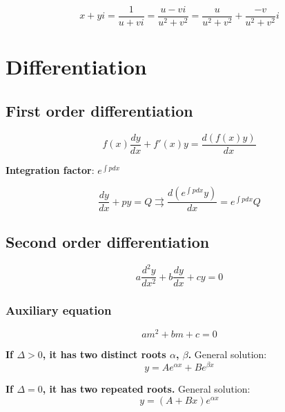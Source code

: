 \documentclass[a4paper,9pt]{scrartcl}
\begin{document}
    \begin{displaymath}
        x + yi = \frac{1}{u + vi} = \frac{u - vi}{u^2 + v^2} = \frac{u}{u^2+v^2} + \frac{-v}{u^2+v^2}i
    \end{displaymath}


    \section{Differentiation}

    \subsection{First order differentiation}

    \begin{displaymath}
        f(x) \frac{dy}{dx} + f'(x) y = \frac{d(f(x) y )}{dx}
    \end{displaymath}

    \textbf{Integration factor}: $\boxed{e^{\int{p}dx}}$

    \begin{displaymath}
        \frac{dy}{dx}+py=Q \rightrightarrows \frac{d(\boxed{e^{\int{p}dx}}y)}{dx} = \boxed{e^{\int{p}dx}} Q
    \end{displaymath}

    \subsection{Second order differentiation}

    \begin{displaymath}
        a\frac{d^{2}y}{dx^2} + b\frac{dy}{dx} + cy = 0
    \end{displaymath}

    \subsubsection{Auxiliary equation}
    \begin{displaymath}
        am^2 + bm + c = 0
    \end{displaymath}

    \textbf{If $\Delta > 0$, it has two distinct roots $\alpha$, $\beta$.}
    General solution:
    \begin{displaymath}
        y = Ae^{{\alpha}x} + Be^{{\beta}x}
    \end{displaymath}

    \textbf{If $\Delta = 0$, it has two repeated roots.}
    General solution:
    \begin{displaymath}
        y = (A+Bx)e^{{\alpha}x}
    \end{displaymath}
\end{document}
